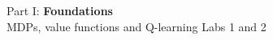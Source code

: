 \begin{frame}{}
    \LARGE Part I: \textbf{Foundations}\\[0.8em]
    \normalsize MDPs, value functions and Q-learning \hfill Labs 1 and 2
\end{frame}
